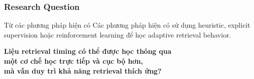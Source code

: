 \begin{frame}
    \frametitle{Research Question}

    \small

    \begin{block}{Từ các phương pháp hiện có}
        Các phương pháp hiện có sử dụng heuristic,
        explicit supervision hoặc reinforcement learning
        để học adaptive retrieval behavior.
    \end{block}

    \vspace{0.25cm}

    \begin{center}
        \large
        \textbf{Liệu retrieval timing có thể được học thông qua}\\
        \textbf{một cơ chế học trực tiếp và cục bộ hơn,}\\
        \textbf{mà vẫn duy trì khả năng retrieval thích ứng?}
    \end{center}

    \vspace{0.25cm}

    \begin{center}
    \end{center}

\end{frame}